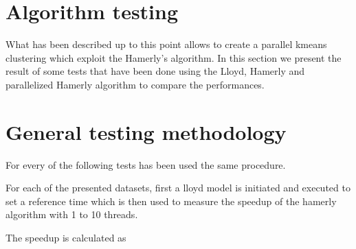 \documentclass{report}
\begin{document}
{\begin{minipage}[b]{0.48\textwidth}
      \section*{Algorithm testing}
      What has been described up to this point allows to create a parallel kmeans clustering which exploit the Hamerly's algorithm. In this section we present the result of some tests that have been done using the Lloyd, Hamerly and parallelized Hamerly algorithm to compare the performances.
    
      \section*{General testing methodology}
      For every of the following tests has been used the same procedure.
    
      For each of the presented datasets, first a lloyd model is initiated and executed to set a reference time which is then used to measure the speedup of the hamerly algorithm with 1 to 10 threads. 

      The speedup is calculated as

\end{minipage}}

\newpage
\end{document}
